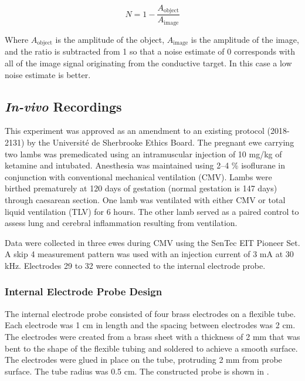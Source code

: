 \begin{equation}
	N = 1-\frac{A_{\text{object}}}{A_{\text{image}}}
\end{equation}

Where $A_{\text{object}}$ is the amplitude of the object, $A_{\text{image}}$ is the amplitude 
of the image, and the ratio is subtracted from 1 so that a noise estimate 
of 0 corresponds with 
all of the image signal originating from the conductive target. 
In this case a low noise estimate is better.

\subsection{\emph{In-vivo} Recordings}
This experiment was approved as an amendment to an existing protocol (2018-2131) 
by the Université de Sherbrooke Ethics Board. The pregnant ewe carrying two lambs was 
premedicated using an intramuscular injection of 10 mg/kg of ketamine and intubated. 
Anesthesia was maintained using 2--4 \% isoflurane in conjunction with conventional 
mechanical ventilation (CMV). Lambs were birthed prematurely at 120 days of 
gestation (normal gestation is 147 days) through caesarean section. 
One lamb was ventilated with either CMV or total liquid ventilation (TLV) for 6 hours. 
The other lamb served as a paired control to assess 
lung and cerebral inflammation resulting from ventilation. 

Data were collected in three ewes during CMV 
using the SenTec EIT Pioneer Set.
A skip 4 measurement pattern was used with an injection current 
of 3 mA at 30 kHz. Electrodes 29 to 32 were connected to the internal
electrode probe. 

\subsubsection{Internal Electrode Probe Design}
The internal electrode probe consisted of four brass electrodes on a flexible tube. 
Each electrode was 1 cm in length and the spacing between electrodes was 2 cm. 
The electrodes were created from
a brass sheet with a thickness of 2 mm that was bent to the shape 
of the flexible tubing and soldered to 
achieve a smooth surface. The electrodes were glued in place 
on the tube, protruding 2 mm from probe surface.
The tube radius was 0.5 cm. The constructed probe is shown in .

